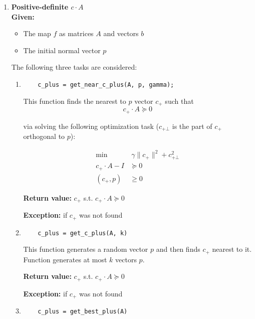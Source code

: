 \documentclass[a4paper]{article}
\theoremstyle{definition}
\begin{document}
\begin{enumerate}
\begin{enumerate}
	{\bf Return value:} $1$ if $F$ is nonconvex
	
	{\bf Exception:} on uncertain case if $c$ was not found or optimization failed
\end{enumerate}

\item {\bf Positive-definite $c\cdot A$}\\
{\bf Given:}
\begin{itemize}
	\item The map $f$ as matrices $A$ and vectors $b$
	\item The initial normal vector $p$
\end{itemize}
The following three tasks are considered:
\begin{enumerate}
	\item \begin{verbatim}
	c_plus = get_near_c_plus(A, p, gamma);
	\end{verbatim}

	This function finds the nearest to $p$ vector $c_+$ such that
	$$c_+\cdot A\succeq 0$$
	
	via solving the following optimization task ($c_{+\bot}$ is the part of $c_+$ orthogonal to $p$):

\begin{align}
\min & ~\gamma \|c_+\|^2+c^2_{+\bot} \nonumber\\
c_+\cdot A-I&  \succeq 0 \nonumber\\
(c_+, p) & \geqslant 0 \nonumber
\end{align}

	{\bf Return value:}  $c_+$ s.t. $c_+\cdot A\succeq 0$
	
	{\bf Exception:} if $c_+$ was not found
	
	\item \begin{verbatim}
	c_plus = get_c_plus(A, k)
	\end{verbatim}
	
	This function generates a random vector $p$ and then finds $c_+$ nearest to it. Function generates at most $k$ vectors $p$.
	
	{\bf Return value:} $c_+$ s.t. $c_+\cdot A\succeq 0$
	
	{\bf Exception:} if $c_+$ was not found
	
	\item \begin{verbatim}
	c_plus = get_best_plus(A)
	\end{verbatim}
	

\end{enumerate}
\end{enumerate}
\end{document}
